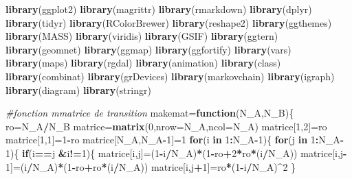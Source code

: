 \documentclass[11pt,]{article}
\newenvironment{Shaded}{\begin{snugshade}}{\end{snugshade}}
\newcommand{\KeywordTok}[1]{\textcolor[rgb]{0.13,0.29,0.53}{\textbf{#1}}}
\newcommand{\DataTypeTok}[1]{\textcolor[rgb]{0.13,0.29,0.53}{#1}}
\newcommand{\DecValTok}[1]{\textcolor[rgb]{0.00,0.00,0.81}{#1}}
\newcommand{\CommentTok}[1]{\textcolor[rgb]{0.56,0.35,0.01}{\textit{#1}}}
\newcommand{\ControlFlowTok}[1]{\textcolor[rgb]{0.13,0.29,0.53}{\textbf{#1}}}
\newcommand{\OperatorTok}[1]{\textcolor[rgb]{0.81,0.36,0.00}{\textbf{#1}}}
\newcommand{\NormalTok}[1]{#1}
\begin{document}
\begin{Shaded}
\begin{Highlighting}[]
\KeywordTok{library}\NormalTok{(ggplot2)}
\KeywordTok{library}\NormalTok{(magrittr)}
\KeywordTok{library}\NormalTok{(rmarkdown)}
\KeywordTok{library}\NormalTok{(dplyr)}
\KeywordTok{library}\NormalTok{(tidyr)}
\KeywordTok{library}\NormalTok{(RColorBrewer)}
\KeywordTok{library}\NormalTok{(reshape2)}
\KeywordTok{library}\NormalTok{(ggthemes)}
\KeywordTok{library}\NormalTok{(MASS)}
\KeywordTok{library}\NormalTok{(viridis)}
\KeywordTok{library}\NormalTok{(GSIF)}
\KeywordTok{library}\NormalTok{(ggtern)}
\KeywordTok{library}\NormalTok{(geomnet)}
\KeywordTok{library}\NormalTok{(ggmap)}
\KeywordTok{library}\NormalTok{(ggfortify)}
\KeywordTok{library}\NormalTok{(vars)}
\KeywordTok{library}\NormalTok{(maps)}
\KeywordTok{library}\NormalTok{(rgdal)}
\KeywordTok{library}\NormalTok{(animation)}
\KeywordTok{library}\NormalTok{(class)}
\KeywordTok{library}\NormalTok{(combinat)}
\KeywordTok{library}\NormalTok{(grDevices)}
\KeywordTok{library}\NormalTok{(markovchain)}
\KeywordTok{library}\NormalTok{(igraph)}
\KeywordTok{library}\NormalTok{(diagram)}
\KeywordTok{library}\NormalTok{(stringr)  }

\CommentTok{#fonction mmatrice de transition}
\NormalTok{makemat=}\ControlFlowTok{function}\NormalTok{(N_A,N_B)\{}
\NormalTok{  ro=N_A}\OperatorTok{/}\NormalTok{N_B}
\NormalTok{  matrice=}\KeywordTok{matrix}\NormalTok{(}\DecValTok{0}\NormalTok{,}\DataTypeTok{nrow=}\NormalTok{N_A,}\DataTypeTok{ncol=}\NormalTok{N_A) }
\NormalTok{  matrice[}\DecValTok{1}\NormalTok{,}\DecValTok{2}\NormalTok{]=ro}
\NormalTok{  matrice[}\DecValTok{1}\NormalTok{,}\DecValTok{1}\NormalTok{]=}\DecValTok{1}\OperatorTok{-}\NormalTok{ro}
\NormalTok{  matrice[N_A,N_A}\OperatorTok{-}\DecValTok{1}\NormalTok{]=}\DecValTok{1}
  \ControlFlowTok{for}\NormalTok{(i }\ControlFlowTok{in} \DecValTok{1}\OperatorTok{:}\NormalTok{N_A}\OperatorTok{-}\DecValTok{1}\NormalTok{)\{}
    \ControlFlowTok{for}\NormalTok{(j }\ControlFlowTok{in} \DecValTok{1}\OperatorTok{:}\NormalTok{N_A}\OperatorTok{-}\DecValTok{1}\NormalTok{)\{}
      \ControlFlowTok{if}\NormalTok{(i}\OperatorTok{==}\NormalTok{j }\OperatorTok{&}\NormalTok{i}\OperatorTok{!=}\DecValTok{1}\NormalTok{)\{}
\NormalTok{        matrice[i,j]=(}\DecValTok{1}\OperatorTok{-}\NormalTok{i}\OperatorTok{/}\NormalTok{N_A)}\OperatorTok{*}\NormalTok{(}\DecValTok{1}\OperatorTok{-}\NormalTok{ro}\OperatorTok{+}\DecValTok{2}\OperatorTok{*}\NormalTok{ro}\OperatorTok{*}\NormalTok{(i}\OperatorTok{/}\NormalTok{N_A))}
\NormalTok{       matrice[i,j}\OperatorTok{-}\DecValTok{1}\NormalTok{]=(i}\OperatorTok{/}\NormalTok{N_A)}\OperatorTok{*}\NormalTok{(}\DecValTok{1}\OperatorTok{-}\NormalTok{ro}\OperatorTok{+}\NormalTok{ro}\OperatorTok{*}\NormalTok{(i}\OperatorTok{/}\NormalTok{N_A))}
\NormalTok{       matrice[i,j}\OperatorTok{+}\DecValTok{1}\NormalTok{]=ro}\OperatorTok{*}\NormalTok{(}\DecValTok{1}\OperatorTok{-}\NormalTok{i}\OperatorTok{/}\NormalTok{N_A)}\OperatorTok{^}\DecValTok{2}
\NormalTok{      \}}
      

\end{Highlighting}
\end{Shaded}
\end{document}
